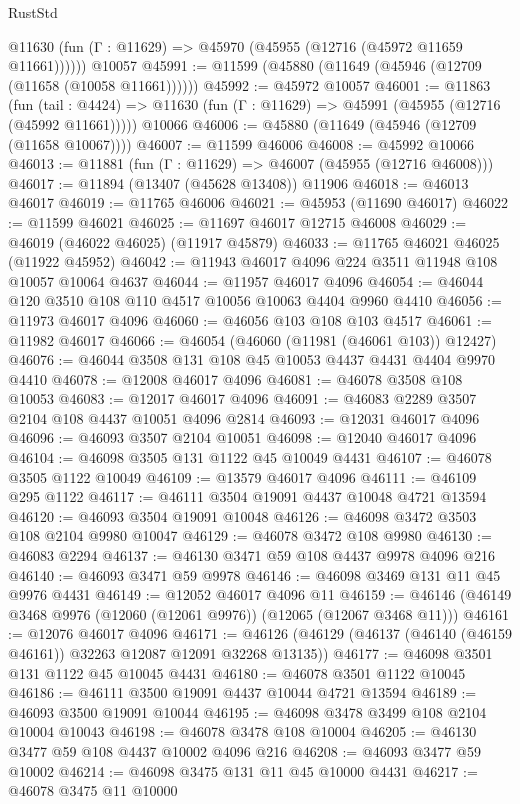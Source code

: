 \begin{lexlean}{RustStd}
\begin{coremodule}
      @11630 (fun (Γ : @11629) => @45970 (@45955 (@12716 (@45972 @11659 @11661))))))
    @10057
@45991 := @11599 (@45880 (@11649 (@45946 (@12709 (@11658 (@10058 @11661))))))
@45992 := @45972 @10057
@46001 := @11863
    (fun (tail : @4424) => @11630 (fun (Γ : @11629) => @45991 (@45955 (@12716 (@45992 @11661)))))
    @10066
@46006 := @45880 (@11649 (@45946 (@12709 (@11658 @10067))))
@46007 := @11599 @46006
@46008 := @45992 @10066
@46013 := @11881 (fun (Γ : @11629) => @46007 (@45955 (@12716 @46008)))
@46017 := @11894 (@13407 (@45628 @13408)) @11906
@46018 := @46013 @46017
@46019 := @11765 @46006
@46021 := @45953 (@11690 @46017)
@46022 := @11599 @46021
@46025 := @11697 @46017 @12715 @46008
@46029 := @46019 (@46022 @46025) (@11917 @45879)
@46033 := @11765 @46021 @46025 (@11922 @45952)
@46042 := @11943 @46017 @4096 @224 @3511 @11948 @108 @10057 @10064 @4637
@46044 := @11957 @46017 @4096
@46054 := @46044 @120 @3510 @108 @110 @4517 @10056 @10063 @4404 @9960 @4410
@46056 := @11973 @46017 @4096
@46060 := @46056 @103 @108 @103 @4517
@46061 := @11982 @46017
@46066 := @46054 (@46060 (@11981 (@46061 @103)) @12427)
@46076 := @46044 @3508 @131 @108 @45 @10053 @4437 @4431 @4404 @9970 @4410
@46078 := @12008 @46017 @4096
@46081 := @46078 @3508 @108 @10053
@46083 := @12017 @46017 @4096
@46091 := @46083 @2289 @3507 @2104 @108 @4437 @10051 @4096 @2814
@46093 := @12031 @46017 @4096
@46096 := @46093 @3507 @2104 @10051
@46098 := @12040 @46017 @4096
@46104 := @46098 @3505 @131 @1122 @45 @10049 @4431
@46107 := @46078 @3505 @1122 @10049
@46109 := @13579 @46017 @4096
@46111 := @46109 @295 @1122
@46117 := @46111 @3504 @19091 @4437 @10048 @4721 @13594
@46120 := @46093 @3504 @19091 @10048
@46126 := @46098 @3472 @3503 @108 @2104 @9980 @10047
@46129 := @46078 @3472 @108 @9980
@46130 := @46083 @2294
@46137 := @46130 @3471 @59 @108 @4437 @9978 @4096 @216
@46140 := @46093 @3471 @59 @9978
@46146 := @46098 @3469 @131 @11 @45 @9976 @4431
@46149 := @12052 @46017 @4096 @11
@46159 := @46146 (@46149 @3468 @9976 (@12060 (@12061 @9976)) (@12065 (@12067 @3468 @11)))
@46161 := @12076 @46017 @4096
@46171 := @46126 (@46129 (@46137 (@46140 (@46159 @46161)) @32263 @12087 @12091 @32268 @13135))
@46177 := @46098 @3501 @131 @1122 @45 @10045 @4431
@46180 := @46078 @3501 @1122 @10045
@46186 := @46111 @3500 @19091 @4437 @10044 @4721 @13594
@46189 := @46093 @3500 @19091 @10044
@46195 := @46098 @3478 @3499 @108 @2104 @10004 @10043
@46198 := @46078 @3478 @108 @10004
@46205 := @46130 @3477 @59 @108 @4437 @10002 @4096 @216
@46208 := @46093 @3477 @59 @10002
@46214 := @46098 @3475 @131 @11 @45 @10000 @4431
@46217 := @46078 @3475 @11 @10000

\end{coremodule}
\end{lexlean}
